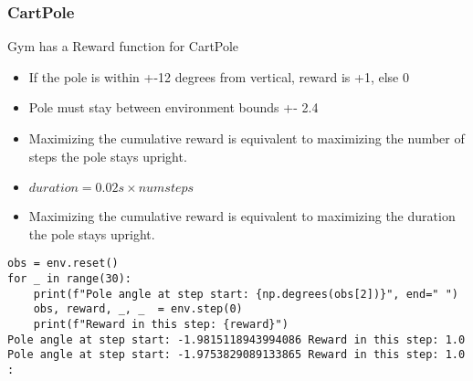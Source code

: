 \begin{frame}[fragile]\frametitle{CartPole}

Gym has a Reward function for CartPole
\begin{itemize}
\item If the pole is within +-12 degrees from vertical, reward is +1, else 0
\item Pole must  stay between environment bounds +- 2.4
\item Maximizing the cumulative reward is equivalent to maximizing the number of steps the pole stays upright.
\item $duration=0.02s \times num steps$
\item Maximizing the cumulative reward is equivalent to maximizing the duration the pole stays upright.
\end{itemize}

\begin{lstlisting}
obs = env.reset()
for _ in range(30):
    print(f"Pole angle at step start: {np.degrees(obs[2])}", end=" ")
    obs, reward, _, _  = env.step(0)
    print(f"Reward in this step: {reward}")
Pole angle at step start: -1.9815118943994086 Reward in this step: 1.0
Pole angle at step start: -1.9753829089133865 Reward in this step: 1.0
:		
\end{lstlisting}


\end{frame}

